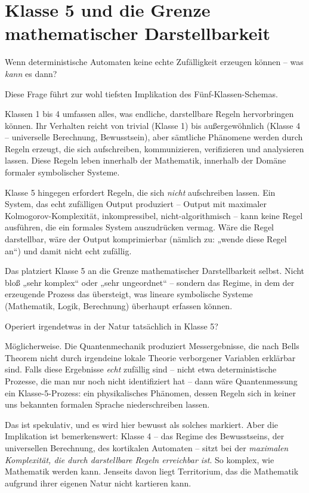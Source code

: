 \documentclass[11pt, twoside, openright]{book}
\begin{document}
\section*{Klasse 5 und die Grenze mathematischer Darstellbarkeit}

Wenn deterministische Automaten keine echte Zufälligkeit erzeugen können -- was \textit{kann} es dann?

Diese Frage führt zur wohl tiefsten Implikation des Fünf-Klassen-Schemas.

Klassen 1 bis 4 umfassen alles, was endliche, darstellbare Regeln hervorbringen können. Ihr Verhalten reicht von trivial (Klasse 1) bis außergewöhnlich (Klasse 4 -- universelle Berechnung, Bewusstsein), aber sämtliche Phänomene werden durch Regeln erzeugt, die sich aufschreiben, kommunizieren, verifizieren und analysieren lassen. Diese Regeln leben innerhalb der Mathematik, innerhalb der Domäne formaler symbolischer Systeme.

Klasse 5 hingegen erfordert Regeln, die sich \textit{nicht} aufschreiben lassen. Ein System, das echt zufälligen Output produziert -- Output mit maximaler Kolmogorov-Komplexität, inkompressibel, nicht-algorithmisch -- kann keine Regel ausführen, die ein formales System auszudrücken vermag. Wäre die Regel darstellbar, wäre der Output komprimierbar (nämlich zu: „wende diese Regel an“) und damit nicht echt zufällig.

Das platziert Klasse 5 an die Grenze mathematischer Darstellbarkeit selbst. Nicht bloß „sehr komplex“ oder „sehr ungeordnet“ -- sondern das Regime, in dem der erzeugende Prozess das übersteigt, was lineare symbolische Systeme (Mathematik, Logik, Berechnung) überhaupt erfassen können.

Operiert irgendetwas in der Natur tatsächlich in Klasse 5?

Möglicherweise. Die Quantenmechanik produziert Messergebnisse, die nach Bells Theorem nicht durch irgendeine lokale Theorie verborgener Variablen erklärbar sind. Falls diese Ergebnisse \textit{echt} zufällig sind -- nicht etwa deterministische Prozesse, die man nur noch nicht identifiziert hat -- dann wäre Quantenmessung ein Klasse-5-Prozess: ein physikalisches Phänomen, dessen Regeln sich in keiner uns bekannten formalen Sprache niederschreiben lassen.

Das ist spekulativ, und es wird hier bewusst als solches markiert. Aber die Implikation ist bemerkenswert: Klasse 4 -- das Regime des Bewusstseins, der universellen Berechnung, des kortikalen Automaten -- sitzt bei der \textit{maximalen Komplexität, die durch darstellbare Regeln erreichbar ist}. So komplex, wie Mathematik werden kann. Jenseits davon liegt Territorium, das die Mathematik aufgrund ihrer eigenen Natur nicht kartieren kann.
\end{document}
